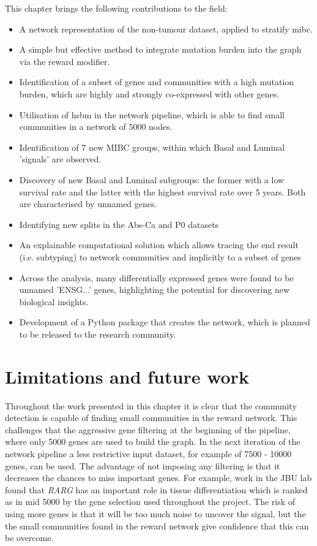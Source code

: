 This chapter brings the following contributions to the field:
\begin{itemize}
    \item A network representation of the non-tumour dataset, applied to stratify \acrfull{mibc}.
    \item A simple but effective method to integrate mutation burden into the graph via the reward modifier.
    \item Identification of a subset of genes and communities with a high mutation burden, which are highly and strongly co-expressed with other genes.
    \item Utilisation of \acrfull{hsbm} in the network pipeline, which is able to find small communities in a network of 5000 nodes.
    \item Identification of 7 new MIBC groups, within which Basal and Luminal 'signals' are observed.
    \item Discovery of new Basal and Luminal subgroups: the former with a low survival rate and the latter with the highest survival rate over 5 years. Both are characterised by unnamed genes.
    \item Identifying new splits in the Abs-Ca and P0 datasets
    \item An explainable computational solution which allows tracing the end result (i.e. subtyping) to network communities and implicitly to a subset of genes
    \item Across the analysis, many differentially expressed genes were found to be unnamed 'ENSG...' genes, highlighting the potential for discovering new biological insights.
    \item Development of a Python package that creates the network, which is planned to be released to the research community.
\end{itemize}


\newpage 


\section{Limitations and future work }

Throughout the work presented in this chapter it is clear that the community detection is capable of finding small communities in the reward network. This challenges that the aggressive gene filtering at the beginning of the pipeline, where only 5000 genes are used to build the graph. In the next iteration of the network pipeline a less restrictive input dataset, for example of 7500 - 10000 genes, can be used. The advantage of not imposing any filtering is that it decreases the chances to miss important genes. For example, work in the JBU lab found that \textit{RARG} has an important role in tissue differentiation which is ranked as in mid 5000 by the gene selection used throughout the project. The risk of using more genes is that it will be too much noise to uncover the signal, but the the small communities found in the reward network give confidence that this can be overcome.

